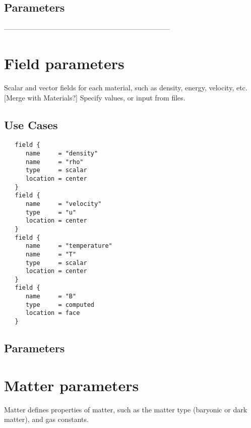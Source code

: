 \documentclass{book}
\begin{document}
\subsection{Parameters}%
-----------------------------------------------------------------------

\section{Field parameters} \label{s:field}

Scalar and vector fields for each material, such as
 density, energy, velocity, etc.  [Merge with Materials?]  Specify
 values, or input from files.

\subsection{Use Cases}
\begin{verbatim}
   field {
      name     = "density"
      name     = "rho"
      type     = scalar
      location = center
   }
   field {
      name     = "velocity"
      type     = "u"
      location = center
   }
   field {
      name     = "temperature"
      name     = "T"
      type     = scalar
      location = center
   }
   field {
      name     = "B"
      type     = computed
      location = face
   }
\end{verbatim}
\subsection{Parameters}

\section{Matter parameters} \label{s:matter}

 Matter defines properties of matter, such as the matter type (baryonic
 or dark matter), and gas constants.
\end{document}
